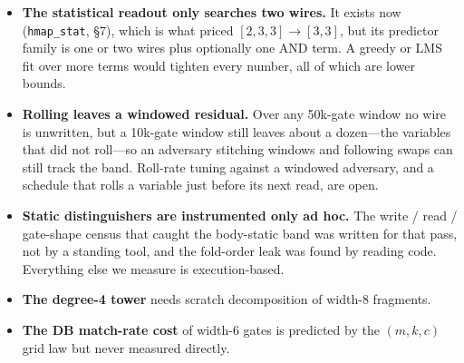 \documentclass[11pt]{article}
\begin{document}
\begin{itemize}
\item \textbf{The statistical readout only searches two wires.} It exists now
(\texttt{hmap\_stat}, \S7), which is what priced $[2,3,3] \to [3,3]$, but its
predictor family is one or two wires plus optionally one AND term. A greedy or
LMS fit over more terms would tighten every number, all of which are lower
bounds.
\item \textbf{Rolling leaves a windowed residual.} Over any 50k-gate window no
wire is unwritten, but a 10k-gate window still leaves about a dozen---the
variables that did not roll---so an adversary stitching windows and following
swaps can still track the band. Roll-rate tuning against a windowed adversary,
and a schedule that rolls a variable just before its next read, are open.
\item \textbf{Static distinguishers are instrumented only ad hoc.} The write /
read / gate-shape census that caught the body-static band was written for that
pass, not by a standing tool, and the fold-order leak was found by reading code.
Everything else we measure is execution-based.
\item \textbf{The degree-4 tower} needs scratch decomposition of width-8
fragments.
\item \textbf{The DB match-rate cost} of width-6 gates is predicted by the
$(m,k,c)$ grid law but never measured directly.
\end{itemize}
\end{document}
